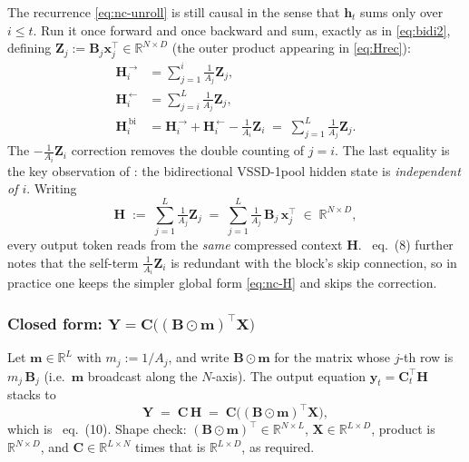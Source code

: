 \documentclass[11pt,a4paper]{article}
\begin{document}
The recurrence \eqref{eq:nc-unroll} is still causal in the sense that
$\bm{h}_t$ sums only over $i\le t$. Run it once forward and once
backward and sum, exactly as in \eqref{eq:bidi2}, defining
$\bm{Z}_j := \bm{B}_j\bm{x}_j^\top \in \mathbb{R}^{N\times D}$ (the
outer product appearing in \eqref{eq:Hrec}):
\begin{align}
  \bm{H}_i^{\,\to}        &= \sum_{j=1}^{i}\tfrac{1}{A_j}\bm{Z}_j, \\
  \bm{H}_i^{\,\leftarrow} &= \sum_{j=i}^{L}\tfrac{1}{A_j}\bm{Z}_j, \\
  \bm{H}_i^{\,\text{bi}}  &= \bm{H}_i^{\,\to} + \bm{H}_i^{\,\leftarrow} - \tfrac{1}{A_i}\bm{Z}_i
                          \;=\; \sum_{j=1}^{L}\tfrac{1}{A_j}\bm{Z}_j. \label{eq:nc-bi}
\end{align}
The $-\tfrac{1}{A_i}\bm{Z}_i$ correction removes the double counting
of $j=i$. The last equality is the key observation of
\cite{vssd}: the bidirectional VSSD-1pool hidden state is
\emph{independent of $i$}. Writing
\begin{equation}\label{eq:nc-H}
  \bm{H} \;:=\; \sum_{j=1}^{L}\tfrac{1}{A_j}\bm{Z}_j
       \;=\; \sum_{j=1}^{L}\tfrac{1}{A_j}\,\bm{B}_j\,\bm{x}_j^\top
       \;\in\;\mathbb{R}^{N\times D},
\end{equation}
every output token reads from the \emph{same} compressed context
$\bm{H}$. \cite{vssd}~eq.~(8) further notes that the self-term
$\tfrac{1}{A_i}\bm{Z}_i$ is redundant with the block's skip
connection, so in practice one keeps the simpler global form
\eqref{eq:nc-H} and skips the correction.

\subsubsection{Closed form: \texorpdfstring{$\bm{Y} = \bm{C}\bigl((\bm{B}\odot\bm{m})^\top\bm{X}\bigr)$}{Y = C ((B .* m)-transpose X)}}

Let $\bm{m}\in\mathbb{R}^{L}$ with $m_j := 1/A_j$, and write $\bm{B}\odot\bm{m}$
for the matrix whose $j$-th row is $m_j\,\bm{B}_j$ (i.e.\ $\bm{m}$
broadcast along the $N$-axis). The output equation
$\bm{y}_t = \bm{C}_t^\top\bm{H}$ stacks to
\begin{equation}\label{eq:nc-Y}
  \boxed{\;\bm{Y} \;=\; \bm{C}\,\bm{H} \;=\; \bm{C}\bigl((\bm{B}\odot\bm{m})^\top\bm{X}\bigr),\;}
\end{equation}
which is \cite{vssd}~eq.~(10). Shape check:
$(\bm{B}\odot\bm{m})^\top\in\mathbb{R}^{N\times L}$, $\bm{X}\in
\mathbb{R}^{L\times D}$, product is $\mathbb{R}^{N\times D}$, and
$\bm{C}\in\mathbb{R}^{L\times N}$ times that is
$\mathbb{R}^{L\times D}$, as required.
\end{document}
